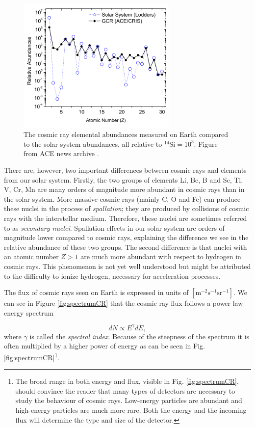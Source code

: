 \begin{figure}
\centering
\includegraphics[width=0.7\textwidth]{./chapter3/img/relativeabundanceACE.png}
\caption{The cosmic ray elemental abundances measured on Earth compared to the solar system abundances, all relative to ${}^{14}\textrm{Si} = 10^3$. Figure from ACE news archive \cite{ISRAEL2005201}.}
\label{fig:relabundance}
\end{figure}
There are, however, two important differences between cosmic rays and elements from our solar system. Firstly, the two groups of elements Li, Be, B and Sc, Ti, V, Cr, Mn are many orders of magnitude more abundant in cosmic rays than in the solar system. More massive cosmic rays (mainly C, O and Fe) can produce these nuclei in the process of \textit{spallation}; they are produced by collisions of cosmic rays with the interstellar medium. Therefore, these nuclei are sometimes referred to as \textit{secondary nuclei}. Spallation effects in our solar system are orders of magnitude lower compared to cosmic rays, explaining the difference we see in the relative abundance of these two groups.
The second difference is that nuclei with an atomic number $Z>1$ are much more abundant with respect to hydrogen in cosmic rays. This phenomenon is not yet well understood but might be attributed to the difficulty to ionize hydrogen, necessary for acceleration processes.

The flux of cosmic rays seen on Earth is expressed in units of $\left[\textrm{m}^{-2} \textrm{s}^{-1} \textrm{sr}^{-1}\right]$. We can see in Figure \ref{fig:spectrumCR} that the cosmic ray flux follows a power law energy spectrum

\begin{equation}
\label{eq:spectrum}
dN \varpropto E^{\gamma} dE,
\end{equation} 
where $\gamma$ is called the \textit{spectral index}. Because of the steepness of the spectrum it is often multiplied by a higher power of energy as can be seen in Fig. \ref{fig:spectrumCR}\footnote{The broad range in both energy and flux, visible in Fig. \ref{fig:spectrumCR}, should convince the reader that many types of detectors are necessary to study the behaviour of cosmic rays. Low-energy particles are abundant and high-energy particles are much more rare. Both the energy and the incoming flux will determine the type and size of the detector.}.

